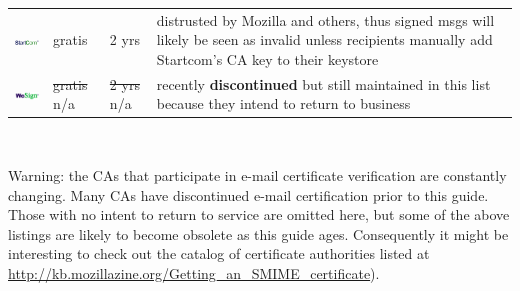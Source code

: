 \documentclass[pdftex,12pt,titlepage=false]{scrartcl}
\begin{document}
\begin{tabular}{lp{2.3cm}l>{\tiny}p{}}
  \href{https://www.startcomca.com/}{\includegraphics[width=2cm]{images/logo_startcom.png}} & gratis & 2 yrs & distrusted by Mozilla and others, thus signed msgs will likely be seen as invalid unless recipients manually add Startcom's CA key to their keystore\\
  \href{https://buy.wosign.com/free/}{\includegraphics[width=2cm]{images/logo_wosign.png}} & \st{gratis} n/a & \st{2 yrs} n/a & recently \textbf{discontinued} but still maintained in this list because they intend to return to business\\
\end{tabular}\\

{\tiny Warning: the CAs that participate in e-mail certificate
  verification are constantly changing.  Many CAs have discontinued
  e-mail certification prior to this guide.  Those with no intent to
  return to service are omitted here, but some of the above listings
  are likely to become obsolete as this guide ages.  Consequently it
  might be interesting to check out the catalog of certificate
  authorities listed at
  \url{http://kb.mozillazine.org/Getting_an_SMIME_certificate}).\par}
\end{document}
